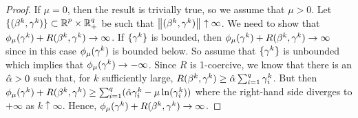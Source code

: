 \begin{proof}
If $\mu=0$, then the result is trivially true, so we assume that $\mu>0$.
Let $\{(\beta^k,\gamma^k)\}\subset {\operatorname{\mathbb{R}}^p}\times\operatorname{\mathbb{R}}^q_+$ be such that $\left\Vert (\beta^k,\gamma^k)\right\Vert\uparrow\infty$.
We need to show that $\phi_\mu(\gamma^k)+R(\beta^k,\gamma^k)\rightarrow \infty$.
If $\{\gamma^k\}$ is bounded, then $\phi_\mu(\gamma^k)+R(\beta^k,\gamma^k)\rightarrow \infty$
since in this case $\phi_\mu(\gamma^k)$ is bounded below.
So assume that $\{\gamma^k\}$ is unbounded which implies that
$\phi_\mu(\gamma^k)\rightarrow -\infty$. Since $R$ is 1-coercive,
we know that there is an $\hat{\alpha}>0$ such that, for $k$ sufficiently large,
$R(\beta^k,\gamma^k)\ge\hat{\alpha}\sum_{i=1}^q\gamma^k_i$. But then
$\phi_\mu(\gamma^k)+R(\beta^k,\gamma^k)\ge \sum_{i=1}^q(\hat{\alpha}\gamma^k_i-\mu\ln(\gamma^k_i))$
where the right-hand side diverges to $+\infty$ as $k\uparrow\infty$.
Hence, $\phi_\mu(\gamma^k)+R(\beta^k,\gamma^k)\rightarrow \infty$.
\end{proof}



